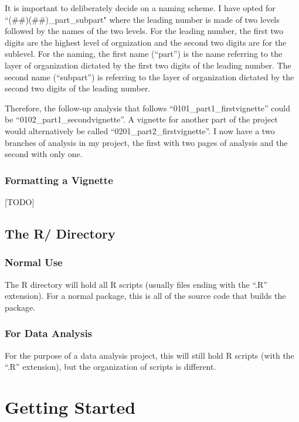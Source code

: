 \documentclass[]{book}
\begin{document}
It is important to deliberately decide on a naming scheme. I have opted
for ``(\#\#)(\#\#)\_part\_subpart" where the leading number is made of
two levels followed by the names of the two levels. For the leading
number, the first two digits are the highest level of orgnization and
the second two digits are for the sublevel. For the naming, the first
name (``part'') is the name referring to the layer of organization
dictated by the first two digits of the leading number. The second name
(``subpart'') is referring to the layer of organization dictated by the
second two digits of the leading number.

Therefore, the follow-up analysis that follows
``0101\_part1\_firstvignette'' could be ``0102\_part1\_secondvignette''.
A vignette for another part of the project would alternatively be called
``0201\_part2\_firstvignette''. I now have a two branches of analysis in
my project, the first with two pages of analysis and the second with
only one.

\subsection{Formatting a Vignette}\label{formatting-a-vignette}

{[}TODO{]}

\section{The R/ Directory}\label{the-r-directory}

\subsection{Normal Use}\label{normal-use}

The R directory will hold all R scripts (usually files ending with the
``.R'' extension). For a normal package, this is all of the source code
that builds the package.

\subsection{For Data Analysis}\label{for-data-analysis}

For the purpose of a data analysis project, this will still hold R
scripts (with the ``.R'' extension), but the organization of scripts is
different.

\chapter{Getting Started}\label{getting-started}
\end{document}
